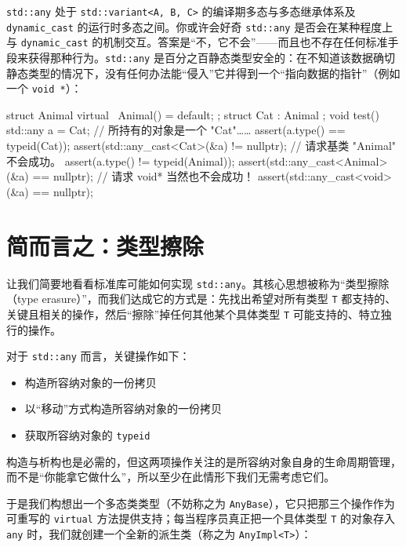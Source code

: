 \texttt{std::\allowbreak{}any} 处于 \texttt{std::\allowbreak{}variant<\allowbreak{}A,\allowbreak{} B,\allowbreak{} C>\allowbreak{}} 的编译期多态与多态继承体系及 \texttt{dynamic\_\allowbreak{}cast} 的运行时多态之间。你或许会好奇 \texttt{std::\allowbreak{}any} 是否会在某种程度上与 \texttt{dynamic\_\allowbreak{}cast} 的机制交互。答案是“不，它不会”——而且也不存在任何标准手段来获得那种行为。\texttt{std::\allowbreak{}any} 是百分之百静态类型安全的：在不知道该数据确切静态类型的情况下，没有任何办法能“侵入”它并得到一个“指向数据的指针”（例如一个 \texttt{void *}）：

\begin{codebox}[cpp]
    struct Animal {
      virtual ~Animal() = default;
    };
    struct Cat : Animal {};
    void test()
    {
      std::any a = Cat{};
      // 所持有的对象是一个 "Cat"……
      assert(a.type() == typeid(Cat));
      assert(std::any_cast<Cat>(&a) != nullptr);
      // 请求基类 "Animal" 不会成功。
      assert(a.type() != typeid(Animal));
      assert(std::any_cast<Animal>(&a) == nullptr);
      // 请求 void* 当然也不会成功！
      assert(std::any_cast<void>(&a) == nullptr);
    }
\end{codebox}

\section{简而言之：类型擦除}

让我们简要地看看标准库可能如何实现 \texttt{std::\allowbreak{}any}。其核心思想被称为“类型擦除（type erasure）”，而我们达成它的方式是：先找出希望对所有类型 \texttt{T} 都支持的、关键且相关的操作，然后“擦除”掉任何其他某个具体类型 \texttt{T} 可能支持的、特立独行的操作。

对于 \texttt{std::\allowbreak{}any} 而言，关键操作如下：

\begin{itemize}
\item 构造所容纳对象的一份拷贝
\item 以“移动”方式构造所容纳对象的一份拷贝
\item 获取所容纳对象的 \texttt{typeid}
\end{itemize}

构造与析构也是必需的，但这两项操作关注的是所容纳对象自身的生命周期管理，而不是“你能拿它做什么”，所以至少在此情形下我们无需考虑它们。

于是我们构想出一个多态类类型（不妨称之为 \texttt{Any\allowbreak{}Base}），它只把那三个操作作为可重写的 \texttt{virtual} 方法提供支持；每当程序员真正把一个具体类型 \texttt{T} 的对象存入 \texttt{any} 时，我们就创建一个全新的派生类（称之为 \texttt{Any\allowbreak{}Impl<\allowbreak{}T>\allowbreak{}}）：

